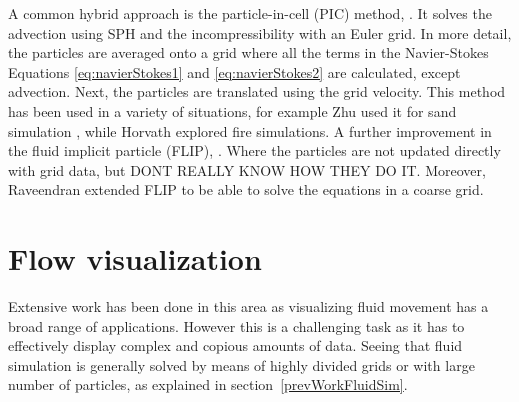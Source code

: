 A common hybrid approach is the particle-in-cell (PIC) method, \cite{Harlow1962}.
It solves the advection using SPH and the incompressibility with an Euler grid.
In more detail, the particles are averaged onto a grid where all the terms in the Navier-Stokes Equations \ref{eq:navierStokes1} and \ref{eq:navierStokes2} are calculated, except advection.
Next, the particles are translated using the grid velocity.
This method has been used in a variety of situations, for example Zhu \cite{Zhu2005} used it for sand simulation , while Horvath \cite{Horvath2009} explored fire simulations.
A further improvement in the fluid implicit particle (FLIP), \cite{J.U.Brackbill1986}.
Where the particles are not updated directly with grid data, but 
DONT REALLY KNOW HOW THEY DO IT.
Moreover, Raveendran \cite{Raveendran2011} extended FLIP to be able to solve the equations in a coarse grid. 

\section{Flow visualization}


Extensive work has been done in this area as visualizing fluid movement has a broad range of applications.
However this is a challenging task as it has to effectively display complex and copious amounts of data.
Seeing that fluid simulation is generally solved by means of highly divided grids or with large number of particles, as explained in section~\ref{prevWorkFluidSim}.\\

